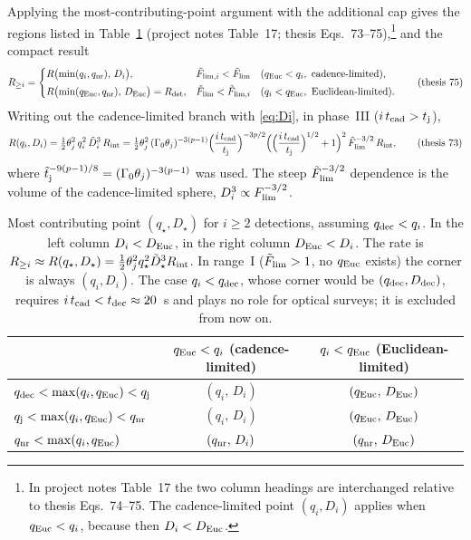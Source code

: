 \documentclass[11pt,a4paper]{article}
\newcommand{\tD}{\tilde{D}}
\newcommand{\tF}{\tilde{F}}
\newcommand{\ttj}{\tilde{t}_{\rm j}}
\newcommand{\Euc}{{\rm Euc}}
\newcommand{\dec}{{\rm dec}}
\newcommand{\nr}{{\rm nr}}
\newcommand{\Flim}{F_{\rm lim}}
\newcommand{\tFlim}{\tilde{F}_{\rm lim}}
\newcommand{\Rint}{R_{\rm int}}
\newcommand{\Rdet}{R_{\rm det}}
\newcommand{\tcad}{t_{\rm cad}}
\newcommand{\tdec}{t_{\rm dec}}
\newcommand{\tj}{t_{\rm j}}
\begin{document}
Applying the most-contributing-point argument with the additional cap gives the regions listed in Table~\ref{tab:regions} (project notes Table~17; thesis Eqs.~73--75),\footnote{In project notes Table~17 the two column headings are interchanged relative to thesis Eqs.~74--75. The cadence-limited point $(q_i,D_i)$ applies when $q_\Euc<q_i$, because then $D_i<D_\Euc$.} and the compact result
\begin{equation}
R_{\geq i}=\begin{cases}R\bigl(\min(q_i,q_\nr),\,D_i\bigr), & \tF_{{\rm lim},i}<\tFlim\quad(q_\Euc<q_i,\ \text{cadence-limited}),\\[3pt] R\bigl(\min(q_\Euc,q_\nr),\,D_\Euc\bigr)=\Rdet, & \tFlim<\tF_{{\rm lim},i}\quad(q_i<q_\Euc,\ \text{Euclidean-limited}).\end{cases}
\tag{thesis 75}
\end{equation}
Writing out the cadence-limited branch with \eqref{eq:Di}, in phase~III ($i\,\tcad>\tj$),
\begin{equation}
R(q_i,D_i)=\tfrac12\theta_j^2\,q_i^2\,\tD_i^3\,\Rint
=\tfrac12\theta_j^2\,(\Gamma_0\theta_j)^{-3(p-1)}\Bigl(\frac{i\,\tcad}{\tj}\Bigr)^{-3p/2}\Bigl(\Bigl(\frac{i\,\tcad}{\tj}\Bigr)^{1/2}+1\Bigr)^2\,\tFlim^{-3/2}\,\Rint ,
\tag{thesis 73}
\end{equation}
where $\ttj^{-9(p-1)/8}=(\Gamma_0\theta_j)^{-3(p-1)}$ was used. The steep $\tFlim^{-3/2}$ dependence is the volume of the cadence-limited sphere, $D_i^3\propto\Flim^{-3/2}$.

\begin{table}[h]
\centering\small
\renewcommand{\arraystretch}{1.3}
\begin{tabular}{lcc}
\toprule
& $q_\Euc<q_i$ \;(cadence-limited) & $q_i<q_\Euc$ \;(Euclidean-limited) \\
\midrule
$q_\dec<\max(q_i,q_\Euc)<q_{\rm j}$ & $(q_i,\,D_i)$ & $(q_\Euc,\,D_\Euc)$ \\
$q_{\rm j}<\max(q_i,q_\Euc)<q_\nr$ & $(q_i,\,D_i)$ & $(q_\Euc,\,D_\Euc)$ \\
$q_\nr<\max(q_i,q_\Euc)$ & $(q_\nr,\,D_i)$ & $(q_\nr,\,D_\Euc)$ \\
\bottomrule
\end{tabular}
\caption{Most contributing point $(q_\star,D_\star)$ for $i\geq2$ detections, assuming $q_\dec<q_i$. In the left column $D_i<D_\Euc$, in the right column $D_\Euc<D_i$. The rate is $R_{\geq i}\approx R(q_\star,D_\star)=\tfrac12\theta_j^2q_\star^2\tD_\star^3\Rint$. In range~I ($\tFlim>1$, no $q_\Euc$ exists) the corner is always $(q_i,D_i)$. The case $q_i<q_\dec$, whose corner would be $(q_\dec,D_\dec)$, requires $i\,\tcad<\tdec\approx20$~s and plays no role for optical surveys; it is excluded from now on.}
\label{tab:regions}
\end{table}
\end{document}
